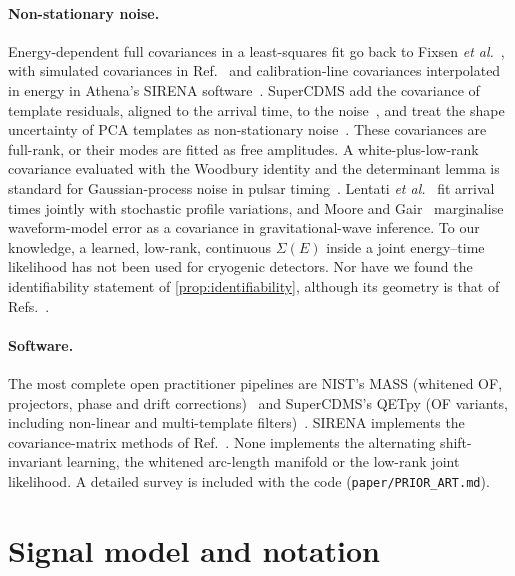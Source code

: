 \documentclass[aps,prapplied,reprint,superscriptaddress,longbibliography,nofootinbib]{revtex4-2}
\theoremstyle{remark}
\begin{document}
\paragraph{Non-stationary noise.} Energy-dependent full covariances in a least-squares
fit go back to Fixsen \emph{et al.}~\cite{Fixsen2002,Fixsen2004}, with simulated
covariances in Ref.~\cite{Shank2014} and calibration-line covariances interpolated in
energy in Athena's SIRENA software~\cite{Peille2016}. SuperCDMS add the covariance of
template residuals, aligned to the arrival time, to the noise~\cite{CDMSlite2018},
and treat the shape uncertainty of PCA templates as non-stationary
noise~\cite{Albakry2026}. These covariances are full-rank, or their modes are fitted
as free amplitudes. A white-plus-low-rank covariance evaluated with the Woodbury
identity and the determinant lemma is standard for Gaussian-process noise in
pulsar timing~\cite{vanHaasteren2014}. Lentati \emph{et al.}~\cite{Lentati2017} fit
arrival times jointly with stochastic profile variations, and Moore and
Gair~\cite{MooreGair2014} marginalise waveform-model error as a covariance in
gravitational-wave inference. To our knowledge, a learned, low-rank, continuous
$\Sigma(E)$ inside a joint energy--time likelihood has not been used for
cryogenic detectors. Nor have we found the identifiability statement of
\cref{prop:identifiability}, although its geometry is that of
Refs.~\cite{Fixsen2014,Fowler2017tangent}.

\paragraph{Software.} The most complete open practitioner pipelines are NIST's
MASS (whitened OF, projectors, phase and drift corrections)~\cite{mass} and
SuperCDMS's QETpy (OF variants, including non-linear and multi-template
filters)~\cite{qetpy}. SIRENA implements the covariance-matrix methods of
Ref.~\cite{Peille2016}. None implements the alternating shift-invariant learning, the
whitened arc-length manifold or the low-rank joint likelihood. A detailed survey is
included with the code (\texttt{paper/PRIOR\_ART.md}).

\section{Signal model and notation}
\label{sec:model}
\end{document}
